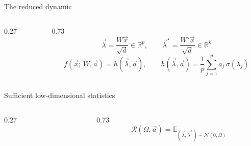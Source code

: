 \documentclass[aspectratio=169,11pt]{beamer}
\begin{document}
\begin{frame}{The reduced dynamic}
  \begin{columns}[c]
    \begin{column}{0.27\textwidth}
      \raggedleft
    \end{column}
    \begin{column}{0.73\textwidth}
      \[
        \vec{\lambda} = \frac{W \vec{x}}{\sqrt{d}} \in \mathbb{R}^p,
        \qquad
        \vec{\lambda}^\star = \frac{W^\star \vec{x}}{\sqrt{d}} \in \mathbb{R}^k
      \]
      \vspace{-0.7em}
      \[
        f(\vec{x};\, W, \vec{a}) = h(\vec{\lambda}, \vec{a}),
        \qquad
        h(\vec{\lambda}, \vec{a}) = \frac{1}{p}\sum_{j=1}^p a_j\,\sigma(\lambda_j)
      \]
    \end{column}
  \end{columns}
  \vspace{0.2em}
  \begin{defbox}[top=3pt, bottom=2pt]{Sufficient low-dimensional statistics}
  \end{defbox}
  \vspace{0.2em}
  \begin{columns}[c]
    \begin{column}{0.27\textwidth}
      \raggedleft
    \end{column}
    \begin{column}{0.73\textwidth}
      \[
        \mathcal{R}(\Omega, \vec{a})
        = \mathbb{E}_{(\vec{\lambda}, \vec{\lambda}^\star) \sim \mathcal{N}(0, \Omega)}
\]
\end{column}
\end{columns}
\end{frame}
\end{document}
